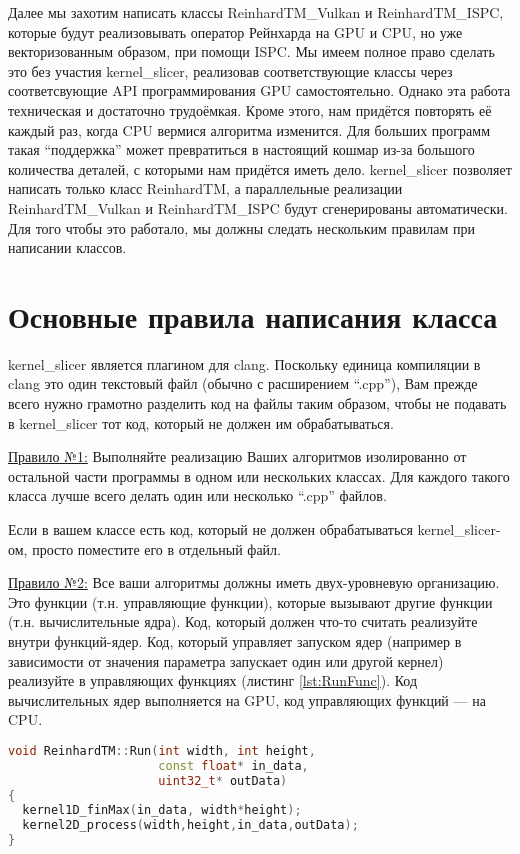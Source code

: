\documentclass[11pt,fleqn,english,russian]{report} %
\begin{document}
Далее мы захотим написать классы ReinhardTM\_Vulkan и ReinhardTM\_ISPC, которые будут реализовывать оператор Рейнхарда на GPU и CPU, но уже векторизованным образом, при помощи ISPC. Мы имеем полное право сделать это без участия kernel\_slicer, реализовав соответствующие классы через соответсвующие API программирования GPU самостоятельно. Однако эта работа техническая и достаточно трудоёмкая. Кроме этого, нам придётся повторять её каждый раз, когда CPU вермися алгоритма изменится. Для больших программ такая ``поддержка'' может превратиться в настоящий кошмар из-за большого количества деталей, с которыми нам придётся иметь дело. kernel\_slicer позволяет написать только класс ReinhardTM, а параллельные реализации ReinhardTM\_Vulkan и ReinhardTM\_ISPC будут сгенерированы автоматически. Для того чтобы это работало, мы должны следать нескольким правилам при написании классов.

\section{Основные правила написания класса}

kernel\_slicer является плагином для clang. Поскольку единица компиляции в clang это один текстовый файл (обычно с расширением ``.cpp''), Вам прежде всего нужно грамотно разделить код на файлы таким образом, чтобы не подавать в kernel\_slicer тот код, который не должен им обрабатываться. 

\underline{Правило №1:} Выполняйте реализацию Ваших алгоритмов изолированно от остальной части программы в одном или нескольких классах. Для каждого такого класса лучше всего делать один или несколько ``.cpp'' файлов.

\begin{remark}
Если в вашем классе есть код, который не должен обрабатываться kernel\_slicer-ом, просто поместите его в отдельный файл.
\end{remark}

\underline{Правило №2:} Все ваши алгоритмы должны иметь двух-уровневую организацию. Это функции (т.н. управляющие функции), которые вызывают другие функции (т.н. вычислительные ядра). Код, который должен что-то считать реализуйте внутри функций-ядер. Код, который управляет запуском ядер (например в зависимости от значения параметра запускает один или другой кернел) реализуйте в управляющих функциях (листинг \ref{lst:RunFunc}). Код вычислительных ядер выполняется на GPU, код управляющих функций --- на CPU.

\begin{lstlisting}[language=C++, 
	               caption=реализация управляющей функции Run, 
	               label=lst:RunFunc]	
void ReinhardTM::Run(int width, int height, 
                     const float* in_data, 
                     uint32_t* outData)
{
  kernel1D_finMax(in_data, width*height);
  kernel2D_process(width,height,in_data,outData);
}
\end{lstlisting}
\end{document}
